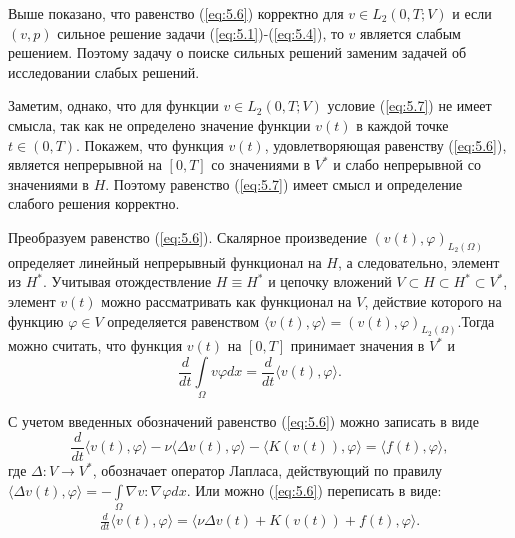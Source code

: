 Выше показано, что равенство (\ref{eq:5.6}) корректно для $v \in L_2(0, T; V)$ и если $(v, p)$ сильное решение задачи (\ref{eq:5.1})-(\ref{eq:5.4}),
то $v$ является слабым решением. Поэтому задачу о поиске сильных решений заменим задачей об исследовании слабых решений.

Заметим, однако, что для функции $v \in L_2(0, T; V)$ условие (\ref{eq:5.7}) не имеет смысла, так как не определено значение функции $v(t)$ в каждой точке
$t \in (0, T)$. Покажем, что функция $v(t)$, удовлетворяющая равенству (\ref{eq:5.6}), является непрерывной на $[0, T]$ со значениями в $V^\ast$ и слабо
непрерывной со значениями в $H$. Поэтому равенство (\ref{eq:5.7}) имеет смысл и определение слабого решения корректно.

Преобразуем равенство (\ref{eq:5.6}). Скалярное произведение $(v(t), \varphi)_{L_2(\Omega)}$ определяет линейный непрерывный функционал на $H$, а следовательно,
элемент из $H^\ast$. Учитывая отождествление $H \equiv H^\ast$ и цепочку вложений $V \subset H \subset H^\ast \subset V^\ast$,
элемент $v(t)$ можно рассматривать как функционал на $V$, действие которого на функцию $\varphi \in V$ определяется равенством 
$\langle v(t),\varphi \rangle = (v(t),\varphi)_{L_2(\Omega)}$.Тогда можно считать, что функция $v(t)$ на $[0, T]$ принимает значения в $V^\ast$ и
$$\frac{d}{dt}\int\limits_\Omega v \varphi dx=\frac{d}{dt}\langle v(t),\varphi \rangle.$$

С учетом введенных обозначений равенство (\ref{eq:5.6}) можно записать в виде
$$\frac{d}{dt} \langle v(t),\varphi \rangle - \nu\langle \Delta v(t), \varphi \rangle -
\langle K(v(t)),\varphi \rangle = \langle f(t),\varphi \rangle,$$
где $\Delta: V \rightarrow V^\ast$, обозначает оператор Лапласа, действующий по правилу
$\langle \Delta v(t),\varphi \rangle=-\int\limits_\Omega \nabla v:\nabla\varphi dx.$
Или можно (\ref{eq:5.6}) переписать в виде:
\begin{equation}\label{eq:5.8}
    \begin{gathered}
        \frac{d}{dt} \langle v(t),\varphi \rangle = \langle \nu\Delta v(t)+K(v(t))+f(t),\varphi \rangle.
    \end{gathered}
\end{equation}

